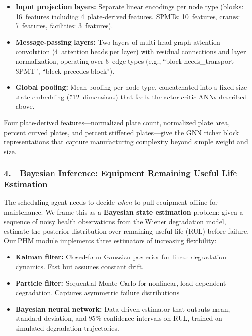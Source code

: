 \documentclass[12pt,letterpaper]{article}
\begin{document}
\begin{itemize}[leftmargin=1.5em]
  \item \textbf{Input projection layers:} Separate linear encodings per node type (blocks: 16~features including 4~plate-derived features, SPMTs: 10~features, cranes: 7~features, facilities: 3~features).
  \item \textbf{Message-passing layers:} Two layers of multi-head graph attention convolution (4~attention heads per layer) with residual connections and layer normalization, operating over 8~edge types (e.g., ``block needs\_transport SPMT'', ``block precedes block'').
  \item \textbf{Global pooling:} Mean pooling per node type, concatenated into a fixed-size state embedding (512~dimensions) that feeds the actor-critic ANNs described above.
\end{itemize}

Four plate-derived features---normalized plate count, normalized plate area, percent curved plates, and percent stiffened plates---give the GNN richer block representations that capture manufacturing complexity beyond simple weight and size.

\subsubsection*{4.\ \ Bayesian Inference: Equipment Remaining Useful Life Estimation}

The scheduling agent needs to decide \emph{when} to pull equipment offline for maintenance. We frame this as a \textbf{Bayesian state estimation} problem: given a sequence of noisy health observations from the Wiener degradation model, estimate the posterior distribution over remaining useful life (RUL) before failure. Our PHM module implements three estimators of increasing flexibility:

\begin{itemize}[leftmargin=1.5em]
  \item \textbf{Kalman filter:} Closed-form Gaussian posterior for linear degradation dynamics. Fast but assumes constant drift.
  \item \textbf{Particle filter:} Sequential Monte Carlo for nonlinear, load-dependent degradation. Captures asymmetric failure distributions.
  \item \textbf{Bayesian neural network:} Data-driven estimator that outputs mean, standard deviation, and 95\% confidence intervals on RUL, trained on simulated degradation trajectories.
\end{itemize}
\end{document}
